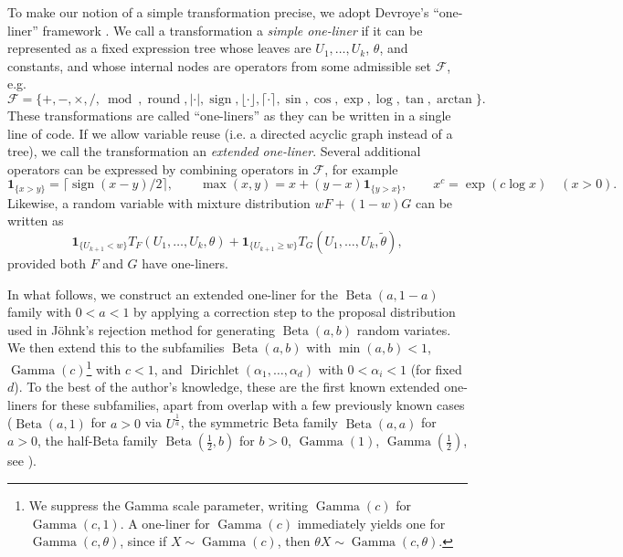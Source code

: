 \documentclass[11pt]{article}
\theoremstyle{plain}
\theoremstyle{remark}
\begin{document}
To make our notion of a simple transformation precise, we adopt Devroye's ``one-liner'' framework \cite{devroye1996oneline}.
We call a transformation a \textit{simple one-liner} if it can be represented as a fixed expression tree whose leaves are $U_1,\dots,U_k$, $\theta$, and constants, and whose internal nodes are operators from some admissible set $\mathcal{F}$, e.g.
\[
\mathcal{F} = \{+, -, \times, /, \bmod, \operatorname{round}, |\cdot|, \operatorname{sign},
\lfloor \cdot \rfloor, \lceil \cdot \rceil, \sin, \cos, \exp,
\log, \tan, \arctan\}.
\]
These transformations are called ``one-liners'' as they can be written in a single line of code.
If we allow variable reuse (i.e. a directed acyclic graph instead of a tree), we call the transformation an \textit{extended one-liner}.
Several additional operators can be expressed by combining operators in $\mathcal{F}$, for example
\[
  \mathbf{1}_{\{x>y\}} = \lceil\operatorname{sign}(x-y)/2\rceil,
  \qquad
  \max(x,y) = x + (y-x)\mathbf{1}_{\{y>x\}},
  \qquad
  x^c = \exp(c\log x)\quad (x>0).
\]
Likewise, a random variable with mixture distribution $wF+(1-w)G$ can be written as
\[
  \mathbf{1}_{\{U_{k+1}< w\}}T_F(U_1,\dots,U_k,\theta)
  + \mathbf{1}_{\{U_{k+1}\geq w\}}T_G(U_1,\dots,U_k,\tilde\theta),
\]
provided both $F$ and $G$ have one-liners.



In what follows, we construct an extended one-liner for the $\operatorname{Beta}(a,1-a)$ family with $0<a<1$ by applying a correction step to the proposal distribution used in J\"ohnk's rejection method \cite{johnk1964beta} for generating $\operatorname{Beta}(a,b)$ random variates.
We then extend this to the subfamilies $\operatorname{Beta}(a,b)$ with $\min(a,b)<1$, $\operatorname{Gamma}(c)$\footnote{We suppress the Gamma scale parameter, writing $\operatorname{Gamma}(c)$ for $\operatorname{Gamma}(c,1)$. A one-liner for $\operatorname{Gamma}(c)$ immediately yields one for $\operatorname{Gamma}(c,\theta)$, since if $X\sim\operatorname{Gamma}(c)$, then $\theta X\sim\operatorname{Gamma}(c,\theta)$.} with $c<1$, and $\operatorname{Dirichlet}(\alpha_1,\dots,\alpha_d)$ with $0<\alpha_i<1$ (for fixed $d$).
To the best of the author's knowledge, these are the first known extended one-liners for these subfamilies, apart from overlap with a few previously known cases ($\operatorname{Beta}(a,1)$ for $a>0$ via $U^{\frac{1}{a}}$, the symmetric Beta family $\operatorname{Beta}(a,a)$ for $a>0$, the half-Beta family $\operatorname{Beta}(\frac{1}{2}, b)$ for $b>0$, $\operatorname{Gamma}(1)$, $\operatorname{Gamma}(\frac{1}{2})$, see \cite{devroye1996oneline}).
\end{document}
